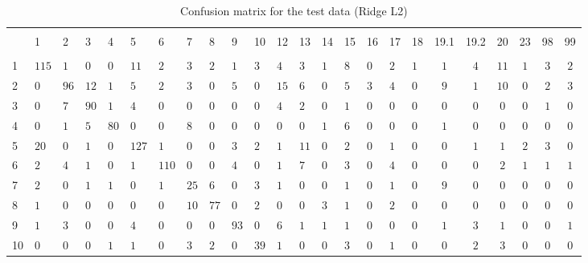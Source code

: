 
\begin{table}[!htbp] \centering 
  \caption{Confusion matrix for the test data (Ridge L2)} 
  \label{tab:confusion-mat-ridge} 
\begin{tabularx}{\textwidth}{XXXXXXXXXXXXXXXXXXcccccc} 
\\[-1.8ex]\hline 
\hline \\[-1.8ex] 
 & 1 & 2 & 3 & 4 & 5 & 6 & 7 & 8 & 9 & 10 & 12 & 13 & 14 & 15 & 16 & 17 & 18 & 19.1 & 19.2 & 20 & 23 & 98 & 99 \\ 
\hline \\[-1.8ex] 
1 & $115$ & $1$ & $0$ & $0$ & $11$ & $2$ & $3$ & $2$ & $1$ & $3$ & $4$ & $3$ & $1$ & $8$ & $0$ & $2$ & $1$ & $1$ & $4$ & $11$ & $1$ & $3$ & $2$ \\ 
2 & $0$ & $96$ & $12$ & $1$ & $5$ & $2$ & $3$ & $0$ & $5$ & $0$ & $15$ & $6$ & $0$ & $5$ & $3$ & $4$ & $0$ & $9$ & $1$ & $10$ & $0$ & $2$ & $3$ \\ 
3 & $0$ & $7$ & $90$ & $1$ & $4$ & $0$ & $0$ & $0$ & $0$ & $0$ & $4$ & $2$ & $0$ & $1$ & $0$ & $0$ & $0$ & $0$ & $0$ & $0$ & $0$ & $1$ & $0$ \\ 
4 & $0$ & $1$ & $5$ & $80$ & $0$ & $0$ & $8$ & $0$ & $0$ & $0$ & $0$ & $0$ & $1$ & $6$ & $0$ & $0$ & $0$ & $1$ & $0$ & $0$ & $0$ & $0$ & $0$ \\ 
5 & $20$ & $0$ & $1$ & $0$ & $127$ & $1$ & $0$ & $0$ & $3$ & $2$ & $1$ & $11$ & $0$ & $2$ & $0$ & $1$ & $0$ & $0$ & $1$ & $1$ & $2$ & $3$ & $0$ \\ 
6 & $2$ & $4$ & $1$ & $0$ & $1$ & $110$ & $0$ & $0$ & $4$ & $0$ & $1$ & $7$ & $0$ & $3$ & $0$ & $4$ & $0$ & $0$ & $0$ & $2$ & $1$ & $1$ & $1$ \\ 
7 & $2$ & $0$ & $1$ & $1$ & $0$ & $1$ & $25$ & $6$ & $0$ & $3$ & $1$ & $0$ & $0$ & $1$ & $0$ & $1$ & $0$ & $9$ & $0$ & $0$ & $0$ & $0$ & $0$ \\ 
8 & $1$ & $0$ & $0$ & $0$ & $0$ & $0$ & $10$ & $77$ & $0$ & $2$ & $0$ & $0$ & $3$ & $1$ & $0$ & $2$ & $0$ & $0$ & $0$ & $0$ & $0$ & $0$ & $0$ \\ 
9 & $1$ & $3$ & $0$ & $0$ & $4$ & $0$ & $0$ & $0$ & $93$ & $0$ & $6$ & $1$ & $1$ & $1$ & $0$ & $0$ & $0$ & $1$ & $3$ & $1$ & $0$ & $0$ & $1$ \\ 
10 & $0$ & $0$ & $0$ & $1$ & $1$ & $0$ & $3$ & $2$ & $0$ & $39$ & $1$ & $0$ & $0$ & $3$ & $0$ & $1$ & $0$ & $0$ & $2$ & $3$ & $0$ & $0$ & $0$ \\ 

\end{tabularx}
\end{table}
